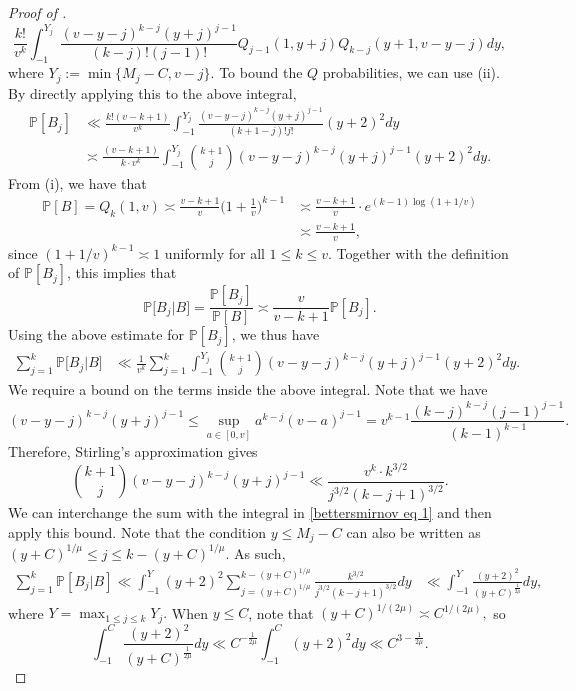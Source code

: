 \documentclass{amsart}
\theoremstyle{definition}
\numberwithin{equation}{section}
\renewcommand{\P}{\mathbb{P}}
\begin{document}
\begin{proof}[Proof of ]
	$$\frac{k!}{v^k}\int_{-1}^{Y_j}\frac{(v-y-j)^{k-j}(y+j)^{j-1}}{(k-j)!(j-1)!}Q_{j-1}(1,  y+j)Q_{k-j}(y+1,v-y-j)dy,$$
	where $Y_j := \min\{M_j-C,v-j\}.$
	To bound the $Q$ probabilities, we can use  (ii). By directly applying this to the above integral,
	\begin{align*}
		\P[B_j]&\ll \frac{k!(v-k+1)}{v^k}\int_{-1}^{Y_j}\frac{(v-y-j)^{k-j}(y+j)^{j-1}}{(k+1-j)!j!} (y+2)^2dy\\
		&\asymp \frac{(v-k+1)}{k \cdot v^k}\int_{-1}^{Y_j}\binom{k+1}{j}(v-y-j)^{k-j}(y+j)^{j-1} (y+2)^2 dy.
	\end{align*}
	From  (i), we have that
	\begin{align*}
		\P[B] = Q_k(1,v) \asymp \frac{v-k+1}{v}\bigg(1+\frac{1}{v}\bigg)^{k-1} &\asymp \frac{v-k+1}{v} \cdot e^{(k-1) \log(1+1/v)}\\
		&\asymp \frac{v-k+1}{v},
	\end{align*}
	since $(1+1/v)^{k-1} \asymp 1$ uniformly for all $1 \leq k \leq v$. Together  with the definition of $\P[B_j]$, this implies that
	$$\P\big[ B_j | B\big] = \frac{\P[B_j]}{\P[B]} \asymp \frac{v}{v-k+1} \P[B_j].$$
	Using the above estimate for $\P[B_j]$, we thus have
	\begin{align}
		\sum_{j = 1}^{k}\P\big[B_j | B\big]  & \ll \frac{1}{v^k} \sum_{j = 1}^{k} \int_{-1}^{Y_j}\binom{k+1}{j}(v-y-j)^{k-j}(y+j)^{j-1} (y+2)^2 dy. \label{bettersmirnov eq 1}
	\end{align}
	We require a bound on the terms inside the above integral. Note that we have
	$$(v-y-j)^{k-j}(y+j)^{j-1} \leq \sup_{a \in [0,v]}a^{k-j}(v-a)^{j-1} = v^{k-1}\frac{(k-j)^{k-j}(j-1)^{j-1}}{(k-1)^{k-1}}.$$
	Therefore, Stirling's approximation gives
	$$\binom{k+1}{j}(v-y-j)^{k-j}(y+j)^{j-1} \ll \frac{v^k \cdot k^{3/2}}{j^{3/2}(k-j+1)^{3/2}}.$$
	We can interchange the sum with the integral in \eqref{bettersmirnov eq 1} and then apply this bound. Note that the condition $y \leq M_j -C$ can also be written as $(y+C)^{1/\mu} \leq j \leq k - (y+C)^{1/\mu}$. As such,
	\begin{align*}
		\sum_{j = 1}^k \P[B_j|B] \ll \int_{-1}^{Y} (y+2)^2 \sum_{j = (y+C)^{1/\mu}}^{k-(y+C)^{1/\mu}} \frac{ k^{3/2}}{j^{3/2}(k-j+1)^{3/2}}  dy &\ll \int_{-1}^{Y}\frac{(y+2)^{2}}{(y+C)^{\frac{1}{2\mu}}}dy,
	\end{align*}
	where $Y = \max_{1 \leq j \leq k}Y_j.$ When $y \leq C$, note that $(y+C)^{1/(2\mu)} \asymp C^{1/(2\mu)},$ so
	$$ \int_{-1}^{C}\frac{(y+2)^{2}}{(y+C)^{\frac{1}{2\mu}}}dy \ll  C^{-\frac{1}{2\mu}}\int_{-1}^{C}(y+2)^{2}dy \ll C^{3-\frac{1}{2\mu}}.$$ 

\end{proof}
\end{document}
